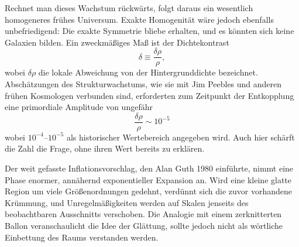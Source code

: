 Rechnet man dieses Wachstum rückwärts, folgt daraus ein wesentlich homogeneres frühes Universum. Exakte Homogenität wäre jedoch ebenfalls unbefriedigend: Die exakte Symmetrie bliebe erhalten, und es könnten sich keine Galaxien bilden. Ein zweckmäßiges Maß ist der Dichtekontrast
\begin{equation}
\delta\equiv\frac{\delta\rho}{\rho},
\end{equation}
wobei \(\delta\rho\) die lokale Abweichung von der Hintergrunddichte bezeichnet. Abschätzungen des Strukturwachstums, wie sie mit Jim Peebles und anderen frühen Kosmologen verbunden sind, erforderten zum Zeitpunkt der Entkopplung eine primordiale Amplitude von ungefähr
\begin{equation}
\boxed{\frac{\delta\rho}{\rho}\sim10^{-5}}
\end{equation}
wobei \(10^{-4}\)--\(10^{-5}\) als historischer Wertebereich angegeben wird. Auch hier schärft die Zahl die Frage, ohne ihren Wert bereits zu erklären.

Der weit gefasste Inflationsvorschlag, den Alan Guth 1980 einführte, nimmt eine Phase enormer, annähernd exponentieller Expansion an. Wird eine kleine glatte Region um viele Größenordnungen gedehnt, verdünnt sich die zuvor vorhandene Krümmung, und Unregelmäßigkeiten werden auf Skalen jenseits des beobachtbaren Ausschnitts verschoben. Die Analogie mit einem zerknitterten Ballon veranschaulicht die Idee der Glättung, sollte jedoch nicht als wörtliche Einbettung des Raums verstanden werden.

\begin{classroomqa}
\end{classroomqa}

\begin{classroomqa}
\end{classroomqa}

